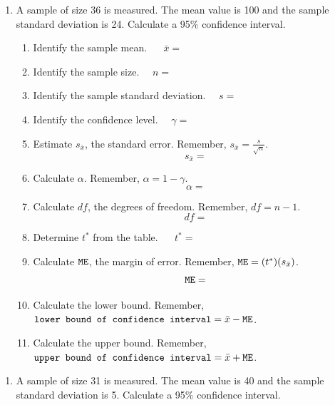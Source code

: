 \documentclass[12pt,letterpaper]{article}
\begin{document}
\newpage
\begin{enumerate}[resume]
\item A sample of size 36 is measured. The mean value is 100 and the sample standard deviation is 24. Calculate a 95\% confidence interval.
\begin{enumerate}
\item Identify the sample mean. ~~ $\bar{x}=$
\item Identify the sample size. ~~$n=$
\item Identify the sample standard deviation. ~~$s=$
\item Identify the confidence level. ~~$\gamma=$
\item Estimate $s_{\bar{x}}$, the standard error. Remember, $s_{\bar{x}}=\frac{s}{\sqrt{n}}$.
\vspace{30pt}
\\$$s_{\bar{x}} = $$
\vspace{10pt}
\item Calculate $\alpha$. Remember, $\alpha = 1-\gamma$.
\vspace{30pt}
\\$$\alpha = $$
\vspace{10pt}
\item Calculate $df$, the degrees of freedom. Remember, $df = n-1$.
\vspace{30pt}
\\$$df = $$
\vspace{10pt}
\item Determine $t^*$ from the table. ~~ $t^*=$
\item Calculate $\mathtt{ME}$, the margin of error. Remember, $\mathtt{ME} = (t^*)(s_{\bar{x}})$.
\vspace{30pt}
\\$$\mathtt{ME} = $$
\vspace{10pt}
\item Calculate the lower bound. Remember, $\texttt{lower bound of confidence interval} = \bar{x}-\mathtt{ME} $.
\vspace{30pt}
\item Calculate the upper bound. Remember, $\texttt{upper bound of confidence interval} = \bar{x}+\mathtt{ME} $.
\vspace{30pt}
\end{enumerate}
\end{enumerate}

\newpage
\begin{enumerate}[resume]
\item A sample of size 31 is measured. The mean value is 40 and the sample standard deviation is 5. Calculate a 95\% confidence interval.
\end{enumerate}
\end{document}
